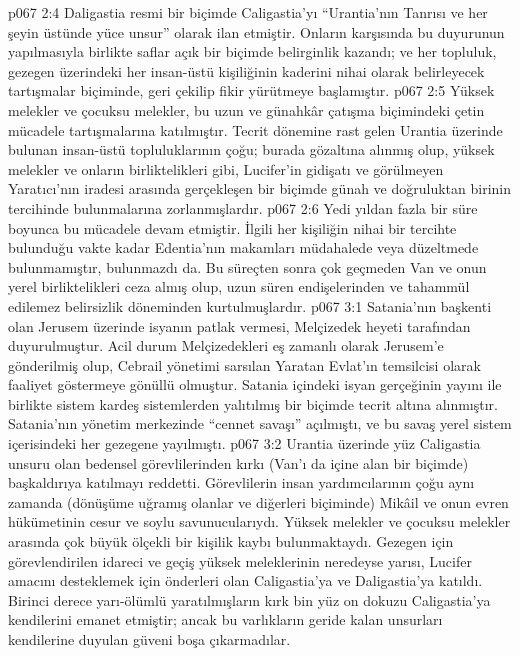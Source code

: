 \vs p067 2:4 Daligastia resmi bir biçimde Caligastia’yı “Urantia’nın Tanrısı ve her şeyin üstünde yüce unsur” olarak ilan etmiştir. Onların karşısında bu duyurunun yapılmasıyla birlikte saflar açık bir biçimde belirginlik kazandı; ve her topluluk, gezegen üzerindeki her insan\hyp{}üstü kişiliğinin kaderini nihai olarak belirleyecek tartışmalar biçiminde, geri çekilip fikir yürütmeye başlamıştır.
\vs p067 2:5 Yüksek melekler ve çocuksu melekler, bu uzun ve günahkâr çatışma biçimindeki çetin mücadele tartışmalarına katılmıştır. Tecrit dönemine rast gelen Urantia üzerinde bulunan insan\hyp{}üstü topluluklarının çoğu; burada gözaltına alınmış olup, yüksek melekler ve onların birliktelikleri gibi, Lucifer’in gidişatı ve görülmeyen Yaratıcı’nın iradesi arasında gerçekleşen bir biçimde günah ve doğruluktan birinin tercihinde bulunmalarına zorlanmışlardır.
\vs p067 2:6 Yedi yıldan fazla bir süre boyunca bu mücadele devam etmiştir. İlgili her kişiliğin nihai bir tercihte bulunduğu vakte kadar Edentia’nın makamları müdahalede veya düzeltmede bulunmamıştır, bulunmazdı da. Bu süreçten sonra çok geçmeden Van ve onun yerel birliktelikleri ceza almış olup, uzun süren endişelerinden ve tahammül edilemez belirsizlik döneminden kurtulmuşlardır.
\vs p067 3:1 Satania’nın başkenti olan Jerusem üzerinde isyanın patlak vermesi, Melçizedek heyeti tarafından duyurulmuştur. Acil durum Melçizedekleri eş zamanlı olarak Jerusem’e gönderilmiş olup, Cebrail yönetimi sarsılan Yaratan Evlat’ın temsilcisi olarak faaliyet göstermeye gönüllü olmuştur. Satania içindeki isyan gerçeğinin yayını ile birlikte sistem kardeş sistemlerden yalıtılmış bir biçimde tecrit altına alınmıştır. Satania’nın yönetim merkezinde “cennet savaşı” açılmıştı, ve bu savaş yerel sistem içerisindeki her gezegene yayılmıştı.
\vs p067 3:2 Urantia üzerinde yüz Caligastia unsuru olan bedensel görevlilerinden kırkı (Van’ı da içine alan bir biçimde) başkaldırıya katılmayı reddetti. Görevlilerin insan yardımcılarının çoğu aynı zamanda (dönüşüme uğramış olanlar ve diğerleri biçiminde) Mikâil ve onun evren hükümetinin cesur ve soylu savunucularıydı. Yüksek melekler ve çocuksu melekler arasında çok büyük ölçekli bir kişilik kaybı bulunmaktaydı. Gezegen için görevlendirilen idareci ve geçiş yüksek meleklerinin neredeyse yarısı, Lucifer amacını desteklemek için önderleri olan Caligastia’ya ve Daligastia’ya katıldı. Birinci derece yarı\hyp{}ölümlü yaratılmışların kırk bin yüz on dokuzu Caligastia’ya kendilerini emanet etmiştir; ancak bu varlıkların geride kalan unsurları kendilerine duyulan güveni boşa çıkarmadılar.
